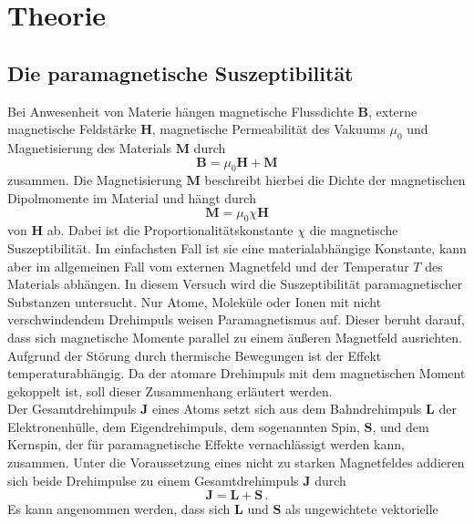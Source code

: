 \section{Theorie}
\label{sec:Theorie}

\subsection{Die paramagnetische Suszeptibilität}
\label{subsec:theoriesuszeptibilitaet}
Bei Anwesenheit von Materie hängen magnetische Flussdichte $\symbf{B}$, externe
magnetische Feldstärke $\symbf{H}$, magnetische Permeabilität des Vakuums $\mu_0$
und Magnetisierung des Materials $\symbf{M}$ durch
\begin{equation}
  \symbf{B} = \mu_0 \symbf{H} + \symbf{M}
  \label{eqn:bhm}
\end{equation}
zusammen. Die Magnetisierung $\symbf{M}$ beschreibt hierbei die Dichte der
magnetischen Dipolmomente im Material und hängt durch
\begin{equation}
  \symbf{M} = \mu_0 \chi \symbf{H}
  \label{eqn:mchih}
\end{equation}
von $\symbf{H}$ ab. Dabei ist die Proportionalitätskonstante
$\chi$ die magnetische Suszeptibilität. Im einfachsten Fall ist sie eine materialabhängige
Konstante, kann aber im allgemeinen Fall vom externen Magnetfeld und der Temperatur $T$
des Materials abhängen.
In diesem Versuch wird die Suszeptibilität paramagnetischer Substanzen untersucht.
Nur Atome, Moleküle oder Ionen mit nicht verschwindendem Drehimpuls weisen
Paramagnetismus auf. Dieser beruht darauf, dass sich magnetische Momente parallel zu
einem äußeren Magnetfeld ausrichten. Aufgrund der Störung durch thermische Bewegungen ist der Effekt
temperaturabhängig. Da der atomare Drehimpuls mit dem magnetischen Moment gekoppelt ist,
soll dieser Zusammenhang erläutert werden. \\
Der Gesamtdrehimpuls $\symbf{J}$ eines Atoms setzt sich aus dem Bahndrehimpuls
$\symbf{L}$ der Elektronenhülle, dem Eigendrehimpuls, dem sogenannten Spin, $\symbf{S}$,
und dem Kernspin, der für paramagnetische Effekte vernachlässigt werden kann, zusammen.
Unter die Voraussetzung eines nicht zu starken Magnetfeldes addieren sich beide
Drehimpulse zu einem Gesamtdrehimpuls $\symbf{J}$ durch
\begin{equation}
  \symbf{J} = \symbf{L} + \symbf{S}\,.
  \label{eqn:ls}
\end{equation}
Es kann angenommen werden, dass sich $\symbf{L}$ und $\symbf{S}$ als ungewichtete vektorielle
